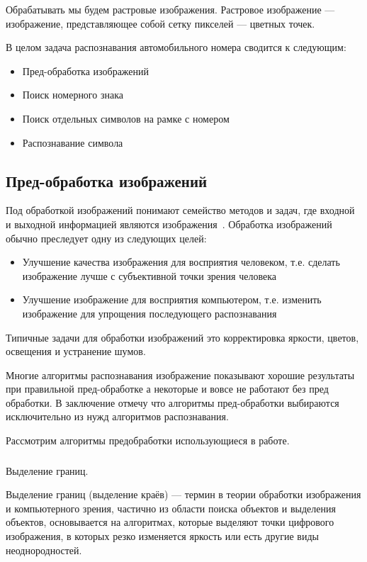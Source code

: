 Обрабатывать мы будем растровые изображения. Растровое изображение — изображение, представляющее собой сетку пикселей — цветных точек.

В целом задача распознавания автомобильного номера сводится к следующим: 
\begin{itemize}
  \item Пред-обработка изображений
  \item Поиск номерного знака
  \item Поиск отдельных символов на рамке с номером
  \item Распознавание символа
\end{itemize}

\subsection{Пред-обработка изображений}
\label{sub:domain:image_processing}
Под обработкой  изображений понимают семейство  методов  и  задач,  где  входной  и  выходной информацией  являются  изображения~\cite{misoi_clides}. Обработка изображений обычно преследует одну из следующих целей:
\begin{itemize}
  \item Улучшение качества изображения для восприятия человеком, т.е. сделать изображение лучше с субъективной точки зрения человека
  \item Улучшение изображение для восприятия компьютером, т.е. изменить изображение для упрощения последующего распознавания
\end{itemize}
Типичные задачи для обработки изображений это корректировка яркости, цветов, освещения и устранение шумов. 

Многие алгоритмы распознавания изображение показывают хорошие результаты при правильной пред-обработке а некоторые и вовсе не работают без пред обработки. В заключение отмечу что алгоритмы пред-обработки выбираются исключительно из нужд алгоритмов распознавания.

Рассмотрим алгоритмы предобработки использующиеся в работе.

\subsubsection{}
\label{sub:domain:image_processing:edges_detection}
Выделение границ.

Выделение границ (выделение краёв) — термин в теории обработки изображения и компьютерного зрения, частично из области поиска объектов и выделения объектов, основывается на алгоритмах, которые выделяют точки цифрового изображения, в которых резко изменяется яркость или есть другие виды неоднородностей.

